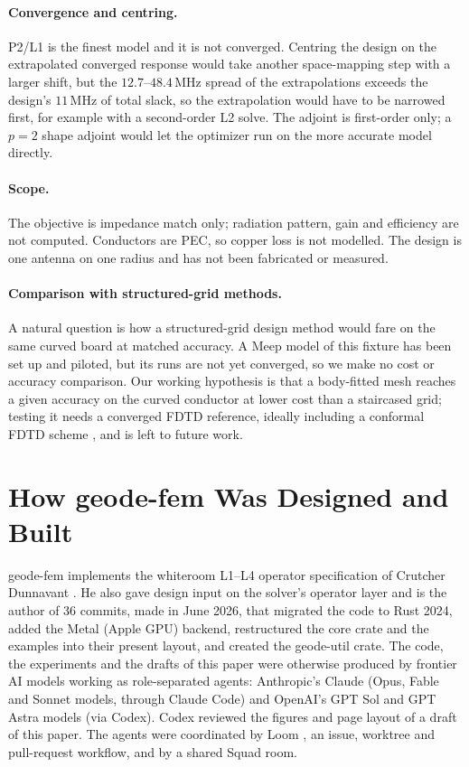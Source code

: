\documentclass{anvil-paper}
\newcommand{\PL}{P2/L1}
\begin{document}
\paragraph{Convergence and centring.}
\PL{} is the finest model and it is not converged. Centring the design on
the extrapolated converged response would take another space-mapping step
with a larger shift, but the $12.7$--$48.4$\,MHz spread of the
extrapolations exceeds the design's $11$\,MHz of total slack, so the
extrapolation would have to be narrowed first, for example with a
second-order L2 solve. The adjoint is first-order only; a $p = 2$ shape
adjoint would let the optimizer run on the more accurate model directly.

\paragraph{Scope.}
The objective is impedance match only; radiation pattern, gain and
efficiency are not computed. Conductors are PEC, so copper loss is not
modelled. The design is one antenna on one radius and has not been
fabricated or measured.

\paragraph{Comparison with structured-grid methods.}
A natural question is how a structured-grid design method would fare on
the same curved board at matched accuracy. A Meep \citep{oskooi2010meep}
model of this fixture has been set up and piloted, but its runs are not
yet converged, so we make no cost or accuracy comparison. Our working
hypothesis is that a body-fitted mesh reaches a given accuracy on the
curved conductor at lower cost than a staircased grid; testing it needs a
converged FDTD reference, ideally including a conformal FDTD scheme
\citep{dey1997locally,zagorodnov2003uniformly}, and is left to future work.

\section{How geode-fem Was Designed and Built}
\label{sec:built}

geode-fem implements the whiteroom L1--L4 operator specification of
Crutcher Dunnavant \citep{dunnavant2026whiteroom}. He also gave design
input on the solver's operator layer and is the author of 36 commits, made
in June 2026, that migrated the code to Rust 2024, added the Metal (Apple
GPU) backend, restructured the core crate and the examples into their
present layout, and created the geode-util crate. The code, the
experiments and the drafts of this paper were otherwise produced by
frontier AI models working as role-separated agents: Anthropic's Claude
(Opus, Fable and Sonnet models, through Claude Code) and OpenAI's GPT Sol
and GPT Astra models (via Codex). Codex reviewed the figures and page
layout of a draft of this paper. The agents were coordinated by Loom
\citep{loom}, an issue, worktree and pull-request workflow, and by a shared
Squad room.
\end{document}
